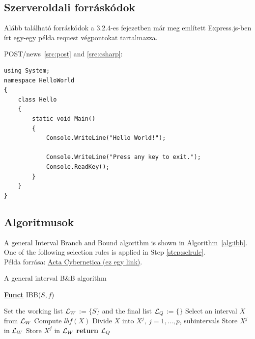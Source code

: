 \subsection{Szerveroldali forráskódok}
Alább található forráskódok a 3.2.4-es fejezetben már meg említett Express.js-ben írt egy-egy példa request végpontokat tartalmazza.

POST/news~\ref{src:post} and \ref{src:csharp}:


\begin{lstlisting}[language={[Sharp]C}]
using System;
namespace HelloWorld
{
	class Hello 
	{
		static void Main() 
		{
			Console.WriteLine("Hello World!");
			
			Console.WriteLine("Press any key to exit.");
			Console.ReadKey();
		}
	}
}
\end{lstlisting}

\subsection{Algoritmusok} %

A general Interval Branch and Bound algorithm is shown in Algorithm~\ref{alg:ibb}. One of the following selection rules is applied in Step \ref{step:selrule}.\\
Példa forrása: \href{https://www.inf.u-szeged.hu/actacybernetica/}{Acta Cybernetica (ez egy link)}.

\begin{algorithm}[H]
\caption{A general interval B\&B algorithm} 
\label{alg:ibb} 
\textbf{\underline{Funct}} IBB($S,f$)
\begin{algorithmic}[1] %
\State Set the working list ${\cal L}_W$ := $\{S\}$ and the final list ${\cal L}_Q$ := $\{\}$     
 \label{alg:igoend}
	\State  Select an interval $X$ from ${\cal L}_W$ \label{step:selrule}  
	\State Compute $lbf(X)$ 		  
	 
		\State Divide $X$ into $X^j,\ j=1,\dots, p$, subintervals   
			 
				\State Store $X^j$ in ${\cal L}_W$ 
			\Else
				\State Store $X^j$ in ${\cal L}_W$ 
			\EndIf
		\EndFor  
	\EndIf
\EndWhile
\State \textbf{return} ${\cal L}_Q$
\end{algorithmic}
\end{algorithm}
